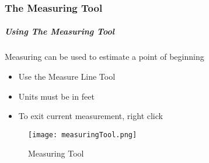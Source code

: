 \clearpage

\subsubsection{The Measuring Tool}
\subparagraph{Using The Measuring Tool}
\vspace{.3in}

\noindent Measuring can be used to estimate a point of beginning
\begin{itemize}
\item Use the Measure Line Tool
\item Units must be in feet  
\item To exit current measurement, right click
\end{itemize}
\begin{figure}[H]
\centering
    \texttt{[image: measuringTool.png]}
\vspace{-.2in}

\caption{Measuring Tool}
\end{figure}

\clearpage


